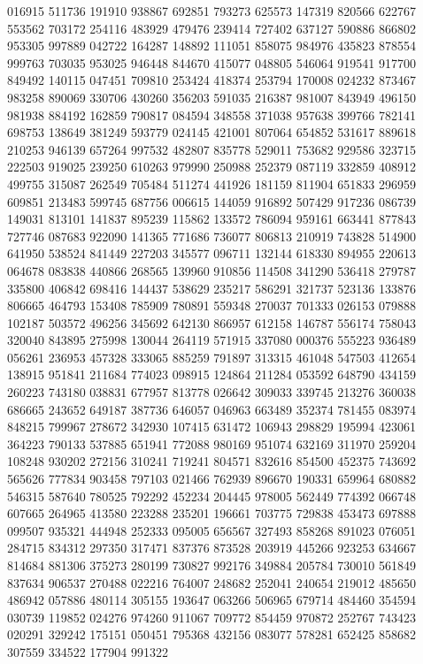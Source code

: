 {016915 511736 191910 938867 692851 793273 625573 147319 820566 622767 553562%
703172 254116 483929 479476 239414 727402 637127 590886 866802 953305 997889%
042722 164287 148892 111051 858075 984976 435823 878554 999763 703035 953025%
946448 844670 415077 048805 546064 919541 917700 849492 140115 047451 709810%
253424 418374 253794 170008 024232 873467 983258 890069 330706 430260 356203%
591035 216387 981007 843949 496150 981938 884192 162859 790817 084594 348558%
371038 957638 399766 782141 698753 138649 381249 593779 024145 421001 807064%
654852 531617 889618 210253 946139 657264 997532 482807 835778 529011 753682%
929586 323715 222503 919025 239250 610263 979990 250988 252379 087119 332859%
408912 499755 315087 262549 705484 511274 441926 181159 811904 651833 296959%
609851 213483 599745 687756 006615 144059 916892 507429 917236 086739 149031%
813101 141837 895239 115862 133572 786094 959161 663441 877843 727746 087683%
922090 141365 771686 736077 806813 210919 743828 514900 641950 538524 841449%
227203 345577 096711 132144 618330 894955 220613 064678 083838 440866 268565%
139960 910856 114508 341290 536418 279787 335800 406842 698416 144437 538629%
235217 586291 321737 523136 133876 806665 464793 153408 785909 780891 559348%
270037 701333 026153 079888 102187 503572 496256 345692 642130 866957 612158%
146787 556174 758043 320040 843895 275998 130044 264119 571915 337080 000376%
555223 936489 056261 236953 457328 333065 885259 791897 313315 461048 547503%
412654 138915 951841 211684 774023 098915 124864 211284 053592 648790 434159%
260223 743180 038831 677957 813778 026642 309033 339745 213276 360038 686665%
243652 649187 387736 646057 046963 663489 352374 781455 083974 848215 799967%
278672 342930 107415 631472 106943 298829 195994 423061 364223 790133 537885%
651941 772088 980169 951074 632169 311970 259204 108248 930202 272156 310241%
719241 804571 832616 854500 452375 743692 565626 777834 903458 797103 021466%
762939 896670 190331 659964 680882 546315 587640 780525 792292 452234 204445%
978005 562449 774392 066748 607665 264965 413580 223288 235201 196661 703775%
729838 453473 697888 099507 935321 444948 252333 095005 656567 327493 858268%
891023 076051 284715 834312 297350 317471 837376 873528 203919 445266 923253%
634667 814684 881306 375273 280199 730827 992176 349884 205784 730010 561849%
837634 906537 270488 022216 764007 248682 252041 240654 219012 485650 486942%
057886 480114 305155 193647 063266 506965 679714 484460 354594 030739 119852%
024276 974260 911067 709772 854459 970872 252767 743423 020291 329242 175151%
050451 795368 432156 083077 578281 652425 858682 307559 334522 177904 991322%
}
